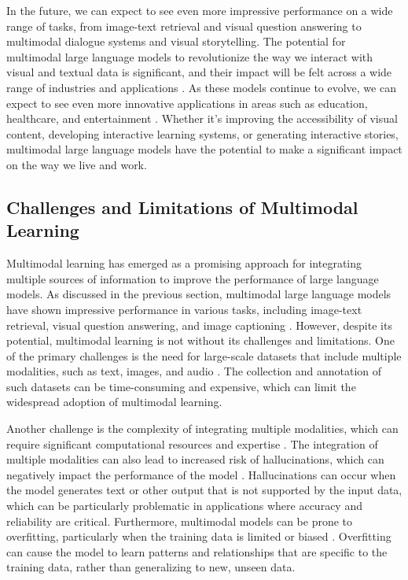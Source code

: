 \documentclass[11pt]{article}
\begin{document}
In the future, we can expect to see even more impressive performance on a wide range of tasks, from image-text retrieval and visual question answering to multimodal dialogue systems and visual storytelling. The potential for multimodal large language models to revolutionize the way we interact with visual and textual data is significant, and their impact will be felt across a wide range of industries and applications \cite{ref295}. As these models continue to evolve, we can expect to see even more innovative applications in areas such as education, healthcare, and entertainment \cite{ref296}. Whether it's improving the accessibility of visual content, developing interactive learning systems, or generating interactive stories, multimodal large language models have the potential to make a significant impact on the way we live and work.

\subsection{Challenges and Limitations of Multimodal Learning}

Multimodal learning has emerged as a promising approach for integrating multiple sources of information to improve the performance of large language models. As discussed in the previous section, multimodal large language models have shown impressive performance in various tasks, including image-text retrieval, visual question answering, and image captioning \cite{ref297}. However, despite its potential, multimodal learning is not without its challenges and limitations. One of the primary challenges is the need for large-scale datasets that include multiple modalities, such as text, images, and audio \cite{ref297}. The collection and annotation of such datasets can be time-consuming and expensive, which can limit the widespread adoption of multimodal learning.

Another challenge is the complexity of integrating multiple modalities, which can require significant computational resources and expertise \cite{ref298}. The integration of multiple modalities can also lead to increased risk of hallucinations, which can negatively impact the performance of the model \cite{ref299}. Hallucinations can occur when the model generates text or other output that is not supported by the input data, which can be particularly problematic in applications where accuracy and reliability are critical. Furthermore, multimodal models can be prone to overfitting, particularly when the training data is limited or biased \cite{ref300}. Overfitting can cause the model to learn patterns and relationships that are specific to the training data, rather than generalizing to new, unseen data.
\end{document}
